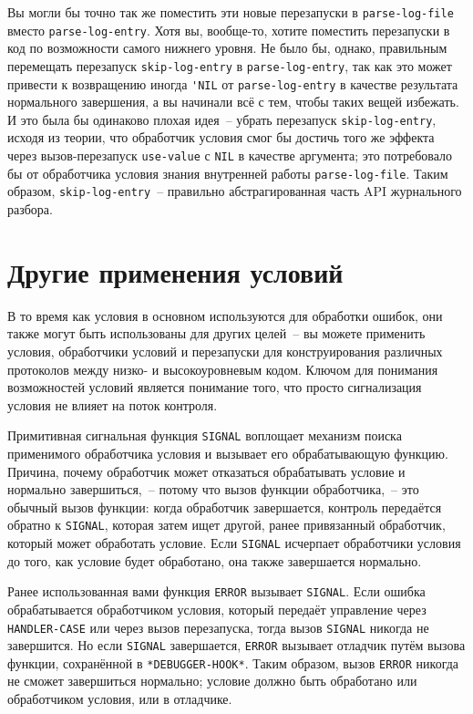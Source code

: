 Вы могли бы точно так же поместить эти новые перезапуски в \lstinline{parse-log-file} вместо
\lstinline{parse-log-entry}. Хотя вы, вообще-то, хотите поместить перезапуски в код
по возможности самого нижнего уровня. Не было бы, однако, правильным перемещать перезапуск
\lstinline{skip-log-entry} в \lstinline{parse-log-entry}, так как это может привести к возвращению
иногда \lstinline{'NIL} от \lstinline{parse-log-entry} в качестве результата нормального завершения,
а вы начинали всё с тем, чтобы таких вещей избежать. И это была бы одинаково плохая идея~--
убрать перезапуск \lstinline{skip-log-entry}, исходя из теории, что обработчик условия смог бы
достичь того же эффекта через вызов-перезапуск \lstinline{use-value} с \lstinline{NIL} в качестве
аргумента; это потребовало бы от обработчика условия знания внутренней работы
\lstinline{parse-log-file}. Таким образом, \lstinline{skip-log-entry}~-- правильно абстрагированная
часть API журнального разбора.

\section{Другие применения условий}
\label{ch19:other-appls}

В то время как условия в основном используются для обработки ошибок, они также могут быть
использованы для других целей~-- вы можете применить условия, обработчики условий и
перезапуски для конструирования различных протоколов между низко- и высокоуровневым
кодом. Ключом для понимания возможностей условий является понимание того, что просто
сигнализация условия не влияет на поток контроля.

Примитивная сигнальная функция \lstinline{SIGNAL} воплощает механизм поиска применимого
обработчика условия и вызывает его обрабатывающую функцию. Причина, почему обработчик
может отказаться обрабатывать условие и нормально завершиться,~-- потому что вызов
функции обработчика,~-- это обычный вызов функции: когда обработчик завершается, контроль
передаётся обратно к \lstinline{SIGNAL}, которая затем ищет другой, ранее привязанный
обработчик, который может обработать условие. Если \lstinline{SIGNAL} исчерпает обработчики
условия до того, как условие будет обработано, она также завершается нормально.

Ранее использованная вами функция \lstinline{ERROR} вызывает \lstinline{SIGNAL}. Если ошибка
обрабатывается обработчиком условия, который передаёт управление через \lstinline{HANDLER-CASE}
или через вызов перезапуска, тогда вызов \lstinline{SIGNAL} никогда не завершится. Но если
\lstinline{SIGNAL} завершается, \lstinline{ERROR} вызывает отладчик путём вызова функции,
сохранённой в \lstinline{*DEBUGGER-HOOK*}. Таким образом, вызов \lstinline{ERROR} никогда не сможет
завершиться нормально; условие должно быть обработано или обработчиком условия, или в
отладчике.

